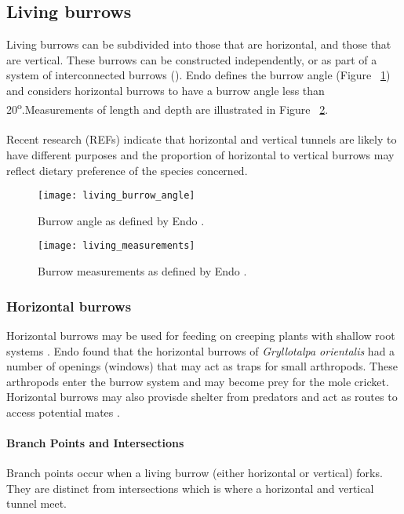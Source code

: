 \documentclass{article}
\begin{document}
   \subsection{Living burrows}
   Living burrows can be subdivided into those that are horizontal, and those that are vertical. These burrows can be constructed independently, or as part of a system of interconnected burrows (\cite{endo2007}). Endo \cite{endo2007} defines the burrow angle (Figure ~\ref{fig:living_burrow_angle}) and considers horizontal burrows to have a burrow angle less than 20\textsuperscript{o}.Measurements of length and depth are illustrated in Figure ~\ref{fig:living_measurements}.
   \paragraph{}
   Recent research (REFs) indicate that horizontal and vertical tunnels are likely to have different purposes and the proportion of horizontal to vertical burrows may reflect dietary preference of the species concerned.  
    \begin{figure}[h]
   	\texttt{[image: living\_burrow\_angle]}
   	\caption{Burrow angle as defined by Endo \cite{endo2007}.}
   	\label{fig:living_burrow_angle}
   \end{figure}
   \begin{figure}[h]
   	\texttt{[image: living\_measurements]}
   	\caption{Burrow measurements as defined by Endo \cite{endo2007}.}
   	\label{fig:living_measurements}
   \end{figure}
   \subsubsection{Horizontal burrows}
   Horizontal burrows may be used for feeding on creeping plants with shallow root systems \cite{endo2007}. Endo \cite{endo2007} found that the horizontal burrows of \textit{Gryllotalpa orientalis} had a number of openings (windows) that may act as traps for small arthropods. These arthropods enter the burrow system and may become prey for the mole cricket. Horizontal burrows may also provisde shelter from predators and act as routes to access potential mates \cite{endo2007}.
   \paragraph{Branch Points and Intersections}
   Branch points occur when a living burrow (either horizontal or vertical) forks. They are distinct from intersections which is where a horizontal and vertical tunnel meet.
\end{document}
